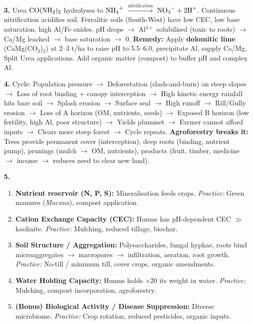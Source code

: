 \documentclass[11pt]{article}
\begin{document}
\begin{corrige}[Exercise 3]
\textbf{3.} Urea $\ce{CO(NH2)2}$ hydrolyses to $\ce{NH4+}$ $\xrightarrow{\text{nitrification}}$ $\ce{NO3-} + 2\ce{H+}$. Continuous nitrification acidifies soil. Ferralitic soils (South-West) have low CEC, low base saturation, high Al/Fe oxides. pH drops $\rightarrow$ Al$^{3+}$ solubilised (toxic to roots) $\rightarrow$ Ca/Mg leached $\rightarrow$ base saturation $\rightarrow$ 0. \textbf{Remedy:} Apply \textbf{dolomitic lime} (CaMg(CO$_3$)$_2$) at 2–3 t/ha to raise pH to 5.5–6.0, precipitate Al, supply Ca/Mg. Split Urea applications. Add organic matter (compost) to buffer pH and complex Al.
\end{corrige}

\begin{corrige}[Exercise 4]
\textbf{4.} Cycle: Population pressure $\rightarrow$ Deforestation (slash-and-burn) on steep slopes $\rightarrow$ Loss of root binding + canopy interception $\rightarrow$ High kinetic energy rainfall hits bare soil $\rightarrow$ Splash erosion $\rightarrow$ Surface seal $\rightarrow$ High runoff $\rightarrow$ Rill/Gully erosion $\rightarrow$ Loss of A horizon (OM, nutrients, seeds) $\rightarrow$ Exposed B horizon (low fertility, high Al, poor structure) $\rightarrow$ Yields plummet $\rightarrow$ Farmer cannot afford inputs $\rightarrow$ Clears more steep forest $\rightarrow$ Cycle repeats. \textbf{Agroforestry breaks it:} Trees provide permanent cover (interception), deep roots (binding, nutrient pump), prunings (mulch $\rightarrow$ OM, nutrients), products (fruit, timber, medicine $\rightarrow$ income $\rightarrow$ reduces need to clear new land).
\end{corrige}

\begin{corrige}[Exercise 5]
\textbf{5.}
\begin{enumerate}
    \item \textbf{Nutrient reservoir (N, P, S):} Mineralisation feeds crops. \emph{Practice:} Green manures (\emph{Mucuna}), compost application.
    \item \textbf{Cation Exchange Capacity (CEC):} Humus has pH-dependent CEC $\gg$ kaolinite. \emph{Practice:} Mulching, reduced tillage, biochar.
    \item \textbf{Soil Structure / Aggregation:} Polysaccharides, fungal hyphae, roots bind microaggregates $\rightarrow$ macropores $\rightarrow$ infiltration, aeration, root growth. \emph{Practice:} No-till / minimum till, cover crops, organic amendments.
    \item \textbf{Water Holding Capacity:} Humus holds $\times 20$ its weight in water. \emph{Practice:} Mulching, compost incorporation, agroforestry.
    \item \textbf{(Bonus) Biological Activity / Disease Suppression:} Diverse microbiome. \emph{Practice:} Crop rotation, reduced pesticides, organic inputs.
\end{enumerate}
\end{corrige}
\end{document}
